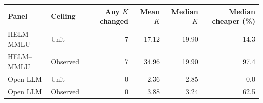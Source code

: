 \begin{tabular}{llrrrr}
\toprule
Panel & Ceiling & Any $K$ changed & Mean $K$ & Median $K$ & Median cheaper (\%) \\
\midrule
HELM--MMLU & Unit & 7 & 17.12 & 19.90 & 14.3 \\
HELM--MMLU & Observed & 7 & 34.96 & 19.90 & 97.4 \\
Open LLM & Unit & 0 & 2.36 & 2.85 & 0.0 \\
Open LLM & Observed & 0 & 3.88 & 3.24 & 62.5 \\
\bottomrule
\end{tabular}
